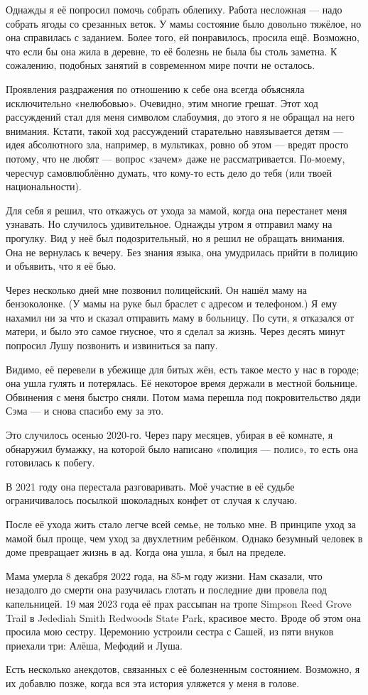 Однажды я её попросил помочь собрать облепиху.
Работа несложная --- надо собрать ягоды со срезанных веток.
У мамы состояние было довольно тяжёлое, но она справилась с заданием. 
Более того, ей понравилось, просила ещё.
Возможно, что если бы она жила в деревне, то её болезнь не была бы столь заметна.
К сожалению, подобных занятий в современном мире почти не осталось.

Проявления раздражения по отношению к себе она всегда объясняла исключительно «нелюбовью».
Очевидно, этим многие грешат.
Этот ход рассуждений стал для меня символом слабоумия, до этого я не обращал на него внимания.
Кстати, такой ход рассуждений старательно навязывается детям --- идея абсолютного зла, например, в мультиках, ровно об этом --- вредят просто потому, что не любят --- вопрос «зачем» даже не рассматривается.
По-моему, чересчур самовлюблённо думать, что кому-то есть дело до тебя (или твоей национальности). 

Для себя я решил, что откажусь от ухода за мамой, когда она перестанет меня узнавать.
Но случилось удивительное.
Однажды утром я отправил маму на прогулку.
Вид у неё был подозрительный, но я решил не обращать внимания.
Она не вернулась к вечеру.
Без знания языка, она умудрилась прийти в полицию и объявить, что я её бью.

Через несколько дней мне позвонил полицейский.
Он нашёл маму на бензоколонке.
(У мамы на руке был браслет с адресом и телефоном.)
Я ему нахамил ни за что и сказал отправить маму в больницу.
По сути, я отказался от матери, и было это самое гнусное, что я сделал за жизнь.
Через десять минут попросил Лушу позвонить и извиниться за папу.

Видимо, её перевели в убежище для битых жён, есть такое место у нас в городе;
она ушла гулять и потерялась.
Её некоторое время держали в местной больнице.
Обвинения с меня быстро сняли. 
Потом мама перешла под покровительство дяди Сэма --- и снова спасибо ему за это.

Это случилось осенью 2020-го.
Через пару месяцев, убирая в её комнате, я обнаружил бумажку, на которой было написано «полиция --- полис»,
то есть она готовилась к побегу.

В 2021 году она перестала разговаривать.
Моё участие в её судьбе ограничивалось посылкой шоколадных конфет от случая к случаю.

После её ухода жить стало легче всей семье, не только мне.
В принципе уход за мамой был проще, чем уход за двухлетним ребёнком.
Однако безумный человек в доме превращает жизнь в ад.
Когда она ушла, я был на пределе.

Мама умерла 8 декабря 2022 года, на 85-м году жизни.
Нам сказали, что незадолго до смерти она разучилась глотать и последние дни провела под капельницей.
19 мая 2023 года её прах рассыпан на тропе Simpson Reed Grove Trail в Jedediah Smith Redwoods State Park,
красивое место.
Вроде об этом она просила мою сестру.
Церемонию устроили сестра с Сашей, из пяти внуков приехали три: Алёша, Мефодий и Луша.

Есть несколько анекдотов, связанных с её болезненным состоянием.
Возможно, я их добавлю позже, когда вся эта история уляжется у меня в голове.
